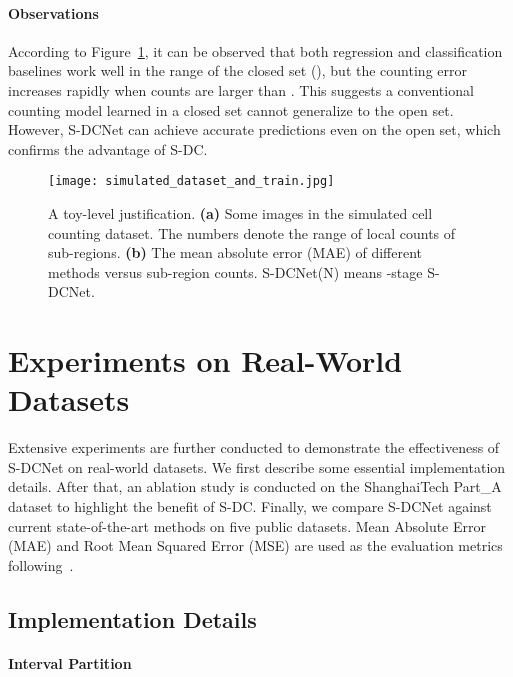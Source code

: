 \documentclass[10pt,twocolumn,letterpaper]{article}
\begin{document}
	\paragraph{Observations}
	According to Figure~\ref{fig:simulated_d_t}, it can be observed that both regression and classification baselines work well in the range of the closed set (), but the counting error increases rapidly when counts are larger than . This suggests a conventional counting model learned in a closed set cannot generalize to the open set. However, S-DCNet can achieve accurate predictions even on the open set, which confirms the advantage of S-DC.


	
	\begin{figure}[t]
		\begin{center}
			\texttt{[image: simulated\_dataset\_and\_train.jpg]}
		\end{center}
		\vspace{-10pt}
		\caption{A toy-level justification. \textbf{(a)} Some  images in the simulated cell counting dataset. The numbers denote the range of local counts of  sub-regions. \textbf{(b)} The mean absolute error (MAE) of different methods versus  sub-region counts. 
S-DCNet(N) means -stage S-DCNet.}
		\label{fig:simulated_d_t}
		\vspace{-10pt}
	\end{figure}
	
	
	\section{Experiments on Real-World Datasets}
	
	Extensive experiments are further conducted to demonstrate the effectiveness of S-DCNet on real-world datasets. We first describe some essential implementation details. After that, an ablation study is conducted on the ShanghaiTech Part\_A~\cite{MCNN_2016_CVPR} dataset to highlight the benefit of S-DC. Finally, we compare S-DCNet against current state-of-the-art methods on five public datasets. Mean Absolute Error (MAE) and Root Mean Squared Error (MSE) are used as the evaluation metrics following~\cite{MCNN_2016_CVPR}.
	


	\subsection{Implementation Details}
	
\paragraph{Interval Partition}\label{One_two_linear}
	
\end{document}
